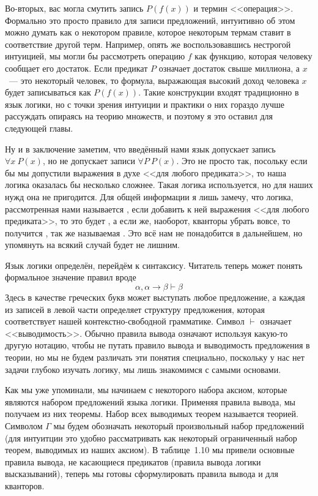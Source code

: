 Во-вторых, вас могла смутить запись $P(f(x))$ и термин <<операция>>. Формально это просто правило для записи предложений, интуитивно об этом можно думать как о некотором правиле, которое некоторым термам ставит в соответствие другой терм. Например, опять же воспользовавшись нестрогой интуицией, мы могли бы рассмотреть операцию $f$ как функцию, которая человеку сообщает его достаток. Если предикат $P$ означает достаток свыше миллиона, а $x$~--- это некоторый человек, то формула, выражающая высокий доход человека $x$ будет записываться как $P(f(x))$. Такие конструкции входят традиционно в язык логики, но с точки зрения интуиции и практики о них гораздо лучше рассуждать опираясь на теорию множеств, и поэтому я это оставил для следующей главы.

Ну и в заключение заметим, что введённый нами язык допускает запись $\forall x\ P(x)$, но не допускает записи $\forall P\ P(x)$. Это не просто так, посольку если бы мы допустили выражения в духе <<для любого предиката>>, то наша логика оказалась бы несколько сложнее. Такая логика используется, но для наших нужд она не пригодится. Для общей информации я лишь замечу, что логика, рассмотренная нами называется , если добавить к ней выражения <<для любого предиката>>, то это будет , а если же, наоборот, кванторы убрать вовсе, то получится , так же называемая . Это всё нам не понадобится в дальнейшем, но упомянуть на всякий случай будет не лишним.

Язык логики определён, перейдём к синтаксису. Читатель теперь может понять формальное значение правил вроде
$$\alpha, \alpha\to\beta \vdash \beta$$
Здесь в качестве греческих букв может выступать любое предложение, а каждая из записей в левой части определяет структуру предложения, которая соответствует нашей контекстно-свободной грамматике. Символ $\vdash$ означает <<выводимость>>. Обычно правила вывода означают используя какую-то другую нотацию, чтобы не путать правило вывода и выводимость предложения в теории, но мы не будем различать эти понятия специально, поскольку у нас нет задачи глубоко изучать логику, мы лишь знакомимся с самыми основами.

Как мы уже упоминали, мы начинаем с некоторого набора аксиом, которые являются набором предложений языка логики. Применяя правила вывода, мы получаем из них теоремы. Набор всех выводимых теорем называется теорией. Символом $\Gamma$ мы будем обозначать некоторый произвольный набор предложений (для интуитции это удобно рассматривать как некоторый ограниченный набор теорем, выводимых из наших аксиом). В таблице~1.10 мы привели основные правила вывода, не касающиеся предикатов (правила вывода логики высказываний), теперь мы готовы сформулировать правила вывода и для кванторов.

